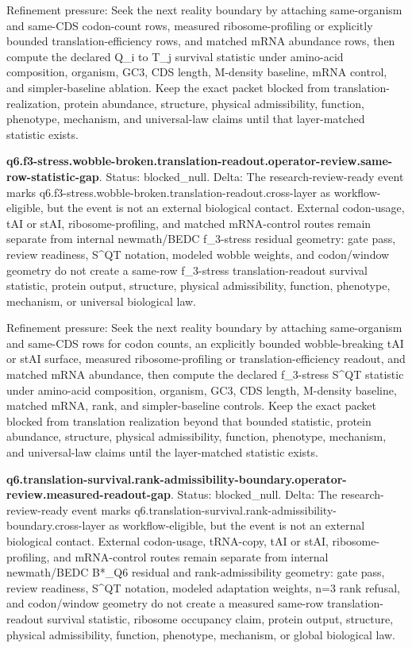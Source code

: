 Refinement pressure: Seek the next reality boundary by attaching same-organism and same-CDS codon-count rows, measured ribosome-profiling or explicitly bounded translation-efficiency rows, and matched mRNA abundance rows, then compute the declared Q\_i to T\_j survival statistic under amino-acid composition, organism, GC3, CDS length, M-density baseline, mRNA control, and simpler-baseline ablation. Keep the exact packet blocked from translation-realization, protein abundance, structure, physical admissibility, function, phenotype, mechanism, and universal-law claims until that layer-matched statistic exists.

\textbf{q6.f3-stress.wobble-broken.translation-readout.operator-review.same-row-statistic-gap}. Status: blocked\_null. Delta: The research-review-ready event marks q6.f3-stress.wobble-broken.translation-readout.cross-layer as workflow-eligible, but the event is not an external biological contact. External codon-usage, tAI or stAI, ribosome-profiling, and matched mRNA-control routes remain separate from internal newmath/BEDC f\_3-stress residual geometry: gate pass, review readiness, S\textasciicircum{}QT notation, modeled wobble weights, and codon/window geometry do not create a same-row f\_3-stress translation-readout survival statistic, protein output, structure, physical admissibility, function, phenotype, mechanism, or universal biological law.

Refinement pressure: Seek the next reality boundary by attaching same-organism and same-CDS rows for codon counts, an explicitly bounded wobble-breaking tAI or stAI surface, measured ribosome-profiling or translation-efficiency readout, and matched mRNA abundance, then compute the declared f\_3-stress S\textasciicircum{}QT statistic under amino-acid composition, organism, GC3, CDS length, M-density baseline, matched mRNA, rank, and simpler-baseline controls. Keep the exact packet blocked from translation realization beyond that bounded statistic, protein abundance, structure, physical admissibility, function, phenotype, mechanism, and universal-law claims until the layer-matched statistic exists.

\textbf{q6.translation-survival.rank-admissibility-boundary.operator-review.measured-readout-gap}. Status: blocked\_null. Delta: The research-review-ready event marks q6.translation-survival.rank-admissibility-boundary.cross-layer as workflow-eligible, but the event is not an external biological contact. External codon-usage, tRNA-copy, tAI or stAI, ribosome-profiling, and mRNA-control routes remain separate from internal newmath/BEDC B*\_Q6 residual and rank-admissibility geometry: gate pass, review readiness, S\textasciicircum{}QT notation, modeled adaptation weights, n=3 rank refusal, and codon/window geometry do not create a measured same-row translation-readout survival statistic, ribosome occupancy claim, protein output, structure, physical admissibility, function, phenotype, mechanism, or global biological law.

